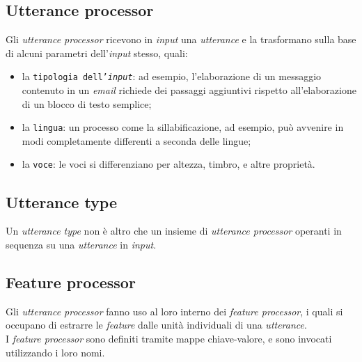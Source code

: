    \subsection{Utterance processor}
   \label{subsec:uttproc}
   Gli \textit{utterance processor} ricevono in \textit{input} una \textit{utterance} e la trasformano sulla base di
   alcuni parametri dell'\textit{input} stesso, quali: 
   \begin{itemize}
     \item la \texttt{tipologia dell'\textit{input}}: ad esempio, l'elaborazione di un messaggio contenuto in un \textit{email}
       richiede dei passaggi aggiuntivi rispetto all'elaborazione di un blocco di testo semplice;
     \item la \texttt{lingua}: un processo come la sillabificazione, ad esempio, può avvenire in modi completamente differenti
       a seconda delle lingue;
     \item la \texttt{voce}: le voci si differenziano per altezza, timbro, e altre proprietà.
   \end{itemize}
   \label{subsec:utttype}
   \subsection{Utterance type}
   Un \textit{utterance type} non è altro che un insieme di \textit{utterance processor} operanti in sequenza su una \textit{utterance}
   in \textit{input}.
   \subsection{Feature processor}
   \label{subsec:featproc}
   Gli \textit{utterance processor} fanno uso al loro interno dei \textit{feature processor}, i quali si occupano di estrarre 
   le \textit{feature} dalle unità individuali di una \textit{utterance}. \\ I \textit{feature processor} sono definiti tramite
   mappe chiave-valore, e sono invocati utilizzando i loro nomi.
